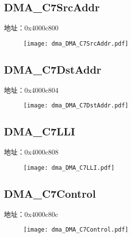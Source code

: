 \subsection{DMA\_C7SrcAddr}
\label{dma-DMA-C7SrcAddr}
地址：0x4000c800
 \begin{figure}[H]
\texttt{[image: dma\_DMA\_C7SrcAddr.pdf]}
\end{figure}

\subsection{DMA\_C7DstAddr}
\label{dma-DMA-C7DstAddr}
地址：0x4000c804
 \begin{figure}[H]
\texttt{[image: dma\_DMA\_C7DstAddr.pdf]}
\end{figure}

\subsection{DMA\_C7LLI}
\label{dma-DMA-C7LLI}
地址：0x4000c808
 \begin{figure}[H]
\texttt{[image: dma\_DMA\_C7LLI.pdf]}
\end{figure}

\subsection{DMA\_C7Control}
\label{dma-DMA-C7Control}
地址：0x4000c80c
 \begin{figure}[H]
\texttt{[image: dma\_DMA\_C7Control.pdf]}
\end{figure}

